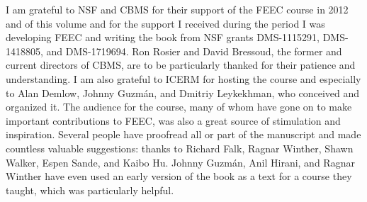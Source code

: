 {I am grateful to NSF and CBMS for their support of the FEEC course in 2012 and of this volume and for the support I received during the period I was developing FEEC and writing the book from NSF grants DMS-1115291, DMS-1418805, and DMS-1719694. Ron Rosier and David Bressoud, the former and current directors of CBMS, are to be particularly thanked for their patience and understanding. I am also grateful to ICERM for hosting the course and especially to Alan Demlow, Johnny Guzmán, and Dmitriy Leykekhman, who conceived and organized it. The audience for the course, many of whom have gone on to make important contributions to FEEC, was also a great source of stimulation and inspiration. Several people have proofread all or part of the manuscript and made countless valuable suggestions: thanks to Richard Falk, Ragnar Winther, Shawn Walker, Espen Sande, and Kaibo Hu. Johnny Guzmán, Anil Hirani, and Ragnar Winther have even used an early version of the book as a text for a course they taught, which was particularly helpful.}
